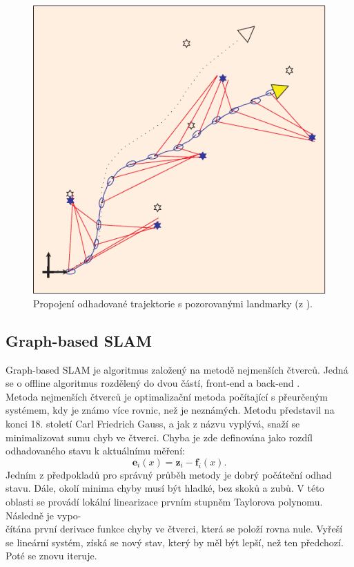 \documentclass[12pt]{report}
\begin{document}
\begin{figure}[!ht]
	\begin{center}
		\includegraphics[width=0.6\columnwidth]{imgs/RBPF_trajectory.pdf}
	\end{center}
	\caption{Propojení odhadované trajektorie s pozorovanými landmarky (z \cite{Durrant-Whyte2006}).}
	\label{fig:RBPF_trajectory}
\end{figure}

\newpage

\subsection{Graph-based SLAM}
Graph-based SLAM je algoritmus založený na metodě nejmenších čtverců. Jedná se o offline algoritmus rozdělený do dvou částí, front-end a back-end \cite{Grisetti2010}.\\
\indent Metoda nejmenších čtverců je optimalizační metoda počítající s přeurčeným systémem, kdy je známo více rovnic, než je neznámých. Metodu představil na konci 18. století Carl Friedrich Gauss, a jak z názvu vyplývá, snaží se minimalizovat sumu chyb ve čtverci. Chyba je zde definována jako rozdíl odhadovaného stavu k aktuálnímu měření:
\begin{equation}
	\textbf{e}_i(x)=\textbf{z}_i-\textbf{f}_i(x).
\end{equation}  
Jedním z předpokladů pro správný průběh metody je dobrý počáteční odhad stavu. Dále, okolí minima chyby musí být hladké, bez skoků a zubů. V této oblasti se provádí lokální linearizace prvním stupněm Taylorova polynomu. Následně je vypo-\\čítána první derivace funkce chyby ve čtverci, která se položí rovna nule. Vyřeší se lineární systém, získá se nový stav, který by měl být lepší, než ten předchozí. Poté se znovu iteruje.
\end{document}
